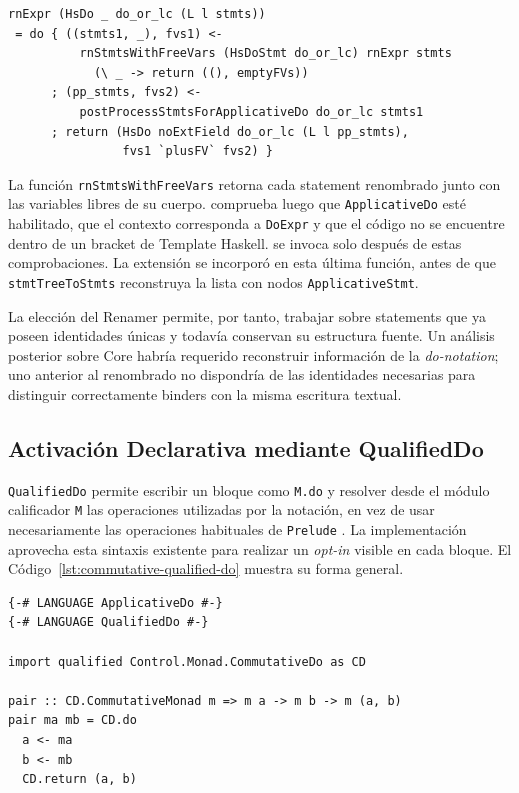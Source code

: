 \begin{lstlisting}[style=haskell,caption={Flujo de renombrado de una expresión \texttt{HsDo} en \texttt{GHC.Rename.Expr}.},label={lst:rnexpr-hsdo}]
rnExpr (HsDo _ do_or_lc (L l stmts))
 = do { ((stmts1, _), fvs1) <-
          rnStmtsWithFreeVars (HsDoStmt do_or_lc) rnExpr stmts
            (\ _ -> return ((), emptyFVs))
      ; (pp_stmts, fvs2) <-
          postProcessStmtsForApplicativeDo do_or_lc stmts1
      ; return (HsDo noExtField do_or_lc (L l pp_stmts),
                fvs1 `plusFV` fvs2) }
\end{lstlisting}

La función \texttt{rnStmtsWithFreeVars} retorna cada statement renombrado junto con las variables libres de su cuerpo.  comprueba luego que \texttt{ApplicativeDo} esté habilitado, que el contexto corresponda a \texttt{DoExpr} y que el código no se encuentre dentro de un bracket de Template Haskell.  se invoca solo después de estas comprobaciones. La extensión se incorporó en esta última función, antes de que \texttt{stmtTreeToStmts} reconstruya la lista con nodos \texttt{ApplicativeStmt}.

La elección del Renamer permite, por tanto, trabajar sobre statements que ya poseen identidades únicas y todavía conservan su estructura fuente. Un análisis posterior sobre Core habría requerido reconstruir información de la \textit{do-notation}; uno anterior al renombrado no dispondría de las identidades necesarias para distinguir correctamente binders con la misma escritura textual.

\subsection{Activación Declarativa mediante QualifiedDo}
\label{sec:solucion-qualified-do}

\texttt{QualifiedDo} permite escribir un bloque como \texttt{M.do} y resolver desde el módulo calificador \texttt{M} las operaciones utilizadas por la notación, en vez de usar necesariamente las operaciones habituales de \texttt{Prelude} \cite{GHCQualifiedDo}. La implementación aprovecha esta sintaxis existente para realizar un \textit{opt-in} visible en cada bloque. El Código~\ref{lst:commutative-qualified-do} muestra su forma general.

\begin{lstlisting}[style=haskell,caption={Bloque activado mediante \texttt{Control.Monad.CommutativeDo}.},label={lst:commutative-qualified-do}]
{-# LANGUAGE ApplicativeDo #-}
{-# LANGUAGE QualifiedDo #-}

import qualified Control.Monad.CommutativeDo as CD

pair :: CD.CommutativeMonad m => m a -> m b -> m (a, b)
pair ma mb = CD.do
  a <- ma
  b <- mb
  CD.return (a, b)
\end{lstlisting}

